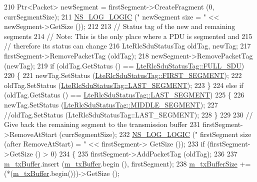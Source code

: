 \begin{DoxyCode}
210           Ptr<Packet> newSegment = firstSegment->CreateFragment (0, currSegmentSize);
211           \hyperlink{group__logging_ga88acd260151caf2db9c0fc84997f45ce}{NS\_LOG\_LOGIC} (\textcolor{stringliteral}{"    newSegment size   = "} << newSegment->GetSize ());
212 
213           \textcolor{comment}{// Status tag of the new and remaining segments}
214           \textcolor{comment}{// Note: This is the only place where a PDU is segmented and}
215           \textcolor{comment}{// therefore its status can change}
216           LteRlcSduStatusTag oldTag, newTag;
217           firstSegment->RemovePacketTag (oldTag);
218           newSegment->RemovePacketTag (newTag);
219           \textcolor{keywordflow}{if} (oldTag.GetStatus () == \hyperlink{classns3_1_1LteRlcSduStatusTag_ae7822c5cc0d54a3d193b09a91ed6f133ade41b0025c66cd211e992196f314d4a5}{LteRlcSduStatusTag::FULL\_SDU})
220             \{
221               newTag.SetStatus (\hyperlink{classns3_1_1LteRlcSduStatusTag_ae7822c5cc0d54a3d193b09a91ed6f133afda65e6233ba6fd1cd8aacf54cd11269}{LteRlcSduStatusTag::FIRST\_SEGMENT});
222               oldTag.SetStatus (\hyperlink{classns3_1_1LteRlcSduStatusTag_ae7822c5cc0d54a3d193b09a91ed6f133a4e59540a0a5c4530b61e4feda355be7b}{LteRlcSduStatusTag::LAST\_SEGMENT});
223             \}
224           \textcolor{keywordflow}{else} \textcolor{keywordflow}{if} (oldTag.GetStatus () == \hyperlink{classns3_1_1LteRlcSduStatusTag_ae7822c5cc0d54a3d193b09a91ed6f133a4e59540a0a5c4530b61e4feda355be7b}{LteRlcSduStatusTag::LAST\_SEGMENT})
225             \{
226               newTag.SetStatus (\hyperlink{classns3_1_1LteRlcSduStatusTag_ae7822c5cc0d54a3d193b09a91ed6f133a37a54694d337625c0c8541e3008d1d64}{LteRlcSduStatusTag::MIDDLE\_SEGMENT});
227               \textcolor{comment}{//oldTag.SetStatus (LteRlcSduStatusTag::LAST\_SEGMENT);}
228             \}
229 
230           \textcolor{comment}{// Give back the remaining segment to the transmission buffer}
231           firstSegment->RemoveAtStart (currSegmentSize);
232           \hyperlink{group__logging_ga88acd260151caf2db9c0fc84997f45ce}{NS\_LOG\_LOGIC} (\textcolor{stringliteral}{"    firstSegment size (after RemoveAtStart) = "} << firstSegment->
      GetSize ());
233           \textcolor{keywordflow}{if} (firstSegment->GetSize () > 0)
234             \{
235               firstSegment->AddPacketTag (oldTag);
236 
237               \hyperlink{classns3_1_1LteRlcUm_ac2c10aa57585dbea3797d651f3dce7be}{m\_txBuffer}.insert (\hyperlink{classns3_1_1LteRlcUm_ac2c10aa57585dbea3797d651f3dce7be}{m\_txBuffer}.begin (), firstSegment);
238               \hyperlink{classns3_1_1LteRlcUm_a22ba9f6bd98fd3b905155ae0d0182b0d}{m\_txBufferSize} += (*(\hyperlink{classns3_1_1LteRlcUm_ac2c10aa57585dbea3797d651f3dce7be}{m\_txBuffer}.begin()))->GetSize ();

\end{DoxyCode}

